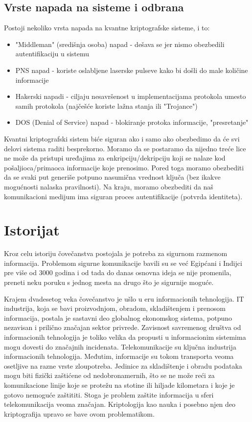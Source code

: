 \documentclass[a4paper]{article}
\begin{document}
{\subsection{Vrste napada na sisteme i odbrana}
Postoji nekoliko vrsta napada na kvantne kriptografske sisteme, i to:
\begin{itemize}
\item "Middleman" (središnja osoba) napad - dešava se jer nismo obezbedili autentifikaciju u sistemu
\item PNS napad - koriste oslabljene laserske pulseve kako bi došli do male količine informacije
\item Hakerski napadi - ciljaju nesavršenost u implementacijama
protokola umesto samih protokola (najčešće koriste lažna stanja ili "Trojance")
\item DOS (Denial of Service) napad - blokiranje protoka informacije, "presretanje"
\end{itemize}
Kvantni kriptografski sistem biće siguran ako i samo ako obezbedimo da će svi delovi sistema raditi besprekorno. Moramo da se postaramo da nijedno treće lice ne može da pristupi uređajima za enkripciju/dekripciju koji se nalaze kod pošaljioca/primaoca informacije koje prenosimo. Pored toga moramo obezbediti da se svaki put generiše potpuno nasumična vrednost ključa (bez ikakve mogućnosti nalaska pravilnosti).  Na kraju, moramo obezbediti da naš komunikacioni medijum ima siguran proces autentifikacije (potvrda identiteta).


\section{Istorijat}	
\label{sec:istorijat}

Kroz celu istoriju čovečanstva postojala je potreba za sigurnom razmenom informacija. Problemom sigurne komunikacije bavili su se već Egipćani i Indijci pre više od 3000 godina i od tada do danas osnovna ideja se nije promenila, preneti neku poruku s jednog mesta na drugo što je sigurnije moguće. 

Krajem dvadesetog veka čovečanstvo je ušlo u eru informacionih tehnologija. IT industrija, koja se bavi proizvodnjom, obradom, skladištenjem i prenosom informacija, postala je sastavni deo globalnog ekonomskog sistema, potpuno nezavisan i prilično značajan sektor privrede. Zavisnost savremenog društva od informacionih tehnologija je toliko velika da propusti u informacionim sistemima mogu dovesti do značajnih incidenata. Telekomunikacije su ključna industrija informacionih tehnologija. Međutim, informacije su tokom transporta veoma osetljive na razne vrste zloupotreba. Jedinice za skladištenje i obradu podataka mogu biti fizički zaštićene od nedobronamernih, što se ne može reći za komunikacione linije koje se protežu na stotine ili hiljade kilometara i koje je gotovo nemoguće zaštititi. Stoga je problem zaštite informacija u sferi telekomunikacija veoma značajan. Kriptologija kao nauka i posebno njen deo kriptografija upravo se bave ovom problematikom.  

}
\end{document}
